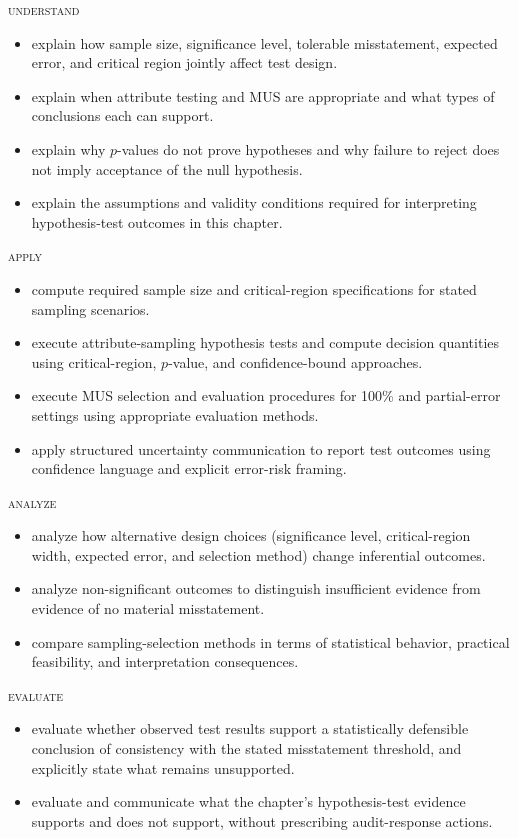 \noindent \textsc{understand}
\begin{itemize}

\item explain how sample size, significance level, tolerable misstatement, expected error, and critical region jointly affect test design.
\item explain when attribute testing and MUS are appropriate and what types of conclusions each can support.
\item explain why $p$-values do not prove hypotheses and why failure to reject does not imply acceptance of the null hypothesis.
\item explain the assumptions and validity conditions required for interpreting hypothesis-test outcomes in this chapter.
\end{itemize}

\noindent \textsc{apply}
\begin{itemize}

\item compute required sample size and critical-region specifications for stated sampling scenarios.
\item execute attribute-sampling hypothesis tests and compute decision quantities using critical-region, $p$-value, and confidence-bound approaches.
\item execute MUS selection and evaluation procedures for 100\% and partial-error settings using appropriate evaluation methods.
\item apply structured uncertainty communication to report test outcomes using confidence language and explicit error-risk framing.
\end{itemize}

\noindent \textsc{analyze}
\begin{itemize}

\item analyze how alternative design choices (significance level, critical-region width, expected error, and selection method) change inferential outcomes.
\item analyze non-significant outcomes to distinguish insufficient evidence from evidence of no material misstatement.
\item compare sampling-selection methods in terms of statistical behavior, practical feasibility, and interpretation consequences.
\end{itemize}

\noindent \textsc{evaluate}
\begin{itemize}

\item evaluate whether observed test results support a statistically defensible conclusion of consistency with the stated misstatement threshold, and explicitly state what remains unsupported.
\item evaluate and communicate what the chapter's hypothesis-test evidence supports and does not support, without prescribing audit-response actions.

\end{itemize}

